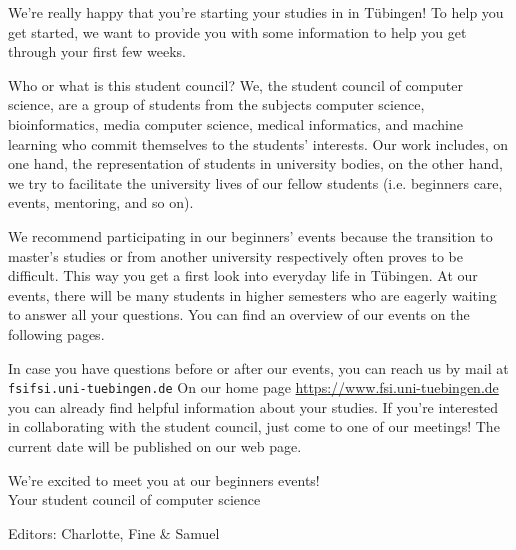 \thispagestyle{firststyle}
We're really happy that you're starting your studies in \studiengang in Tübingen!
To help you get started, we want to provide you with some information to help you get through your first few weeks.

Who or what is this \glqq student council\grqq? We, the student council of computer science, are a group of students from the subjects computer science, bioinformatics, media computer science, medical informatics, and machine learning
who commit themselves to the students' interests. Our work includes, on one hand, the representation of students in university bodies, on the other hand, we try to facilitate the university lives of our fellow students (i.e. beginners care,
events, mentoring, and so on).

\ifmaster
    \ifml
We recommend participating in our beginners' events because the transition to master's studies or from another university respectively often proves to be difficult. This way you get a first look into everyday life in Tübingen.
    \fi
\fi
At our events, there will be many students in higher semesters who are eagerly waiting to answer all your questions. You can find an overview of our events on the following pages.

In case you have questions before or after our events, you can reach us by mail at \texttt{fsi\At fsi.uni-tuebingen.de}
On our home page
\url{https://www.fsi.uni-tuebingen.de} you can already find helpful information about your studies. If you're interested in collaborating with the student council, just come to one of our meetings! The current date will be published on our web page.

We're excited to meet you at our beginners events!\\
Your student council of computer science
\enlargethispage{3\baselineskip} %
\par\hfill{\footnotesize Editors: Charlotte, Fine \& Samuel}
\vfill


